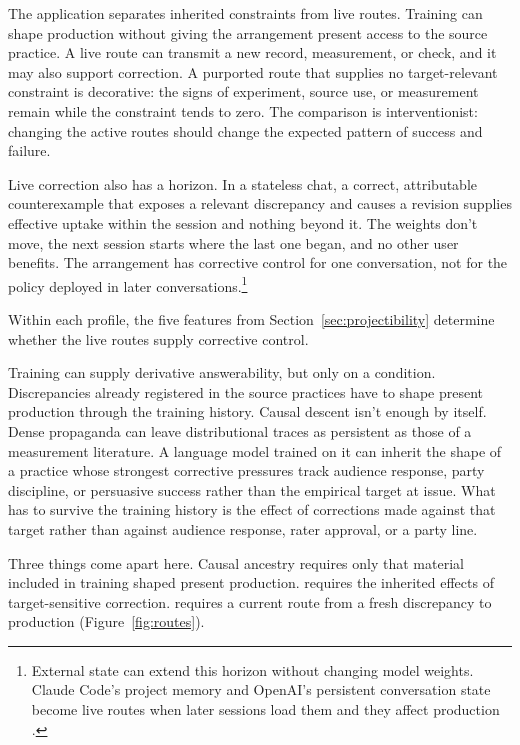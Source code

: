 \documentclass[12pt]{article}
\begin{document}
The application separates inherited constraints from live routes. Training can shape
production without giving the arrangement
present access to the source practice. A live route can transmit a new record,
measurement, or check, and it may also support correction. A purported route that supplies
no target-relevant constraint is decorative: the signs of experiment, source use,
or measurement remain while the constraint tends to zero. The comparison is
interventionist: changing the active routes should change the expected pattern of success
and failure.

Live correction also has a horizon. In a stateless chat, a correct, attributable
counterexample that exposes a relevant discrepancy and causes a revision supplies
effective uptake within the session and nothing beyond it. The weights don't move, the
next session starts where the last one began, and no other user benefits.
The arrangement has corrective control for one conversation, not for the policy deployed
in later conversations.\footnote{External state can extend this horizon without changing
model weights. Claude Code's project memory and OpenAI's persistent conversation state
become live routes when later sessions load them and they affect production
\citep{anthropic2026claudecodememory,openai2026conversationstate}.}

Within each profile, the five features from Section~\ref{sec:projectibility} determine
whether the live routes supply corrective control.

Training can supply derivative answerability, but only on a condition. Discrepancies
already registered in the source practices have to shape present production through the
training history. Causal descent isn't enough by itself. Dense propaganda
can leave distributional traces as persistent as those of a measurement literature. A
language model trained on it can inherit the shape of a practice whose strongest corrective pressures track
audience response, party discipline, or persuasive success rather than the empirical
target at issue. What has to survive the training history is the effect of corrections
made against that target rather than against audience response, rater approval, or a party line.

Three things come apart here. Causal ancestry requires only that material included
in training shaped present production.  requires the
inherited effects of target-sensitive correction.  requires a
current route from a fresh discrepancy to production (Figure~\ref{fig:routes}).
\end{document}
